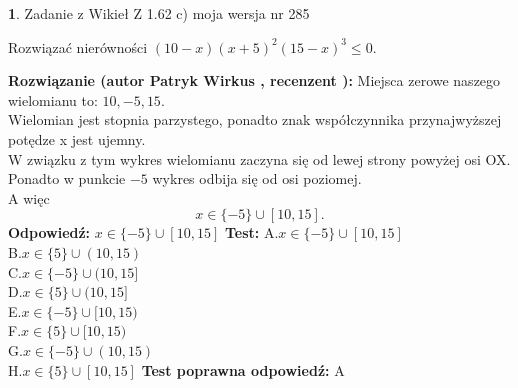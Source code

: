 \documentclass[12pt, a4paper]{article}
\theoremstyle{definition} %
\newtheorem{zad}{}
\newcommand{\zadStart}[1]{\begin{zad}#1\newline}
\newcommand{\zadStop}{\end{zad}}
\newcommand{\rozwStart}[2]{\noindent \textbf{Rozwiązanie (autor #1 , recenzent #2): }\newline}
\newcommand{\rozwStop}{\newline}
\newcommand{\odpStart}{\noindent \textbf{Odpowiedź:}\newline}
\newcommand{\odpStop}{\newline}
\newcommand{\testStart}{\noindent \textbf{Test:}\newline}
\newcommand{\testStop}{\newline}
\newcommand{\kluczStart}{\noindent \textbf{Test poprawna odpowiedź:}\newline}
\newcommand{\kluczStop}{\newline}
\begin{document}
\zadStart{Zadanie z Wikieł Z 1.62 c) moja wersja nr 285}

Rozwiązać nierówności $(10-x)(x+5)^{2}(15-x)^{3}\le0$.
\zadStop
\rozwStart{Patryk Wirkus}{}
Miejsca zerowe naszego wielomianu to: $10, -5, 15$.\\
Wielomian jest stopnia parzystego, ponadto znak współczynnika przy\linebreak najwyższej potędze x jest ujemny.\\ W związku z tym wykres wielomianu zaczyna się od lewej strony powyżej osi OX.\\
Ponadto w punkcie $-5$ wykres odbija się od osi poziomej.\\
A więc $$x \in \{-5\} \cup [10,15].$$
\rozwStop
\odpStart
$x \in \{-5\} \cup [10,15]$
\odpStop
\testStart
A.$x \in \{-5\} \cup [10,15]$\\
B.$x \in \{5\} \cup (10,15)$\\
C.$x \in \{-5\} \cup (10,15]$\\
D.$x \in \{5\} \cup (10,15]$\\
E.$x \in \{-5\} \cup [10,15)$\\
F.$x \in \{5\} \cup [10,15)$\\
G.$x \in \{-5\} \cup (10,15)$\\
H.$x \in \{5\} \cup [10,15]$
\testStop
\kluczStart
A
\kluczStop
\end{document}
